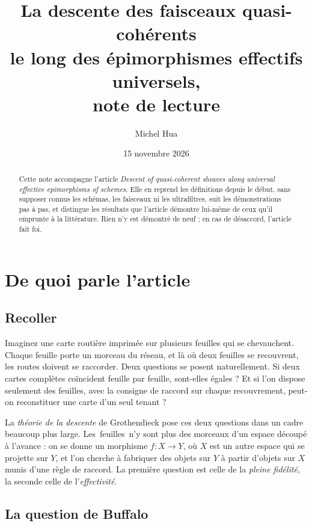 \documentclass[11pt,a4paper]{amsart}
\title[Note de lecture : descente le long des épimorphismes effectifs universels]{La descente des faisceaux quasi-cohérents\\ le long des épimorphismes effectifs universels,\\ note de lecture}
\author{Michel Hua}
\date{15 novembre 2026}
\theoremstyle{definition}
\theoremstyle{plain}
\theoremstyle{remark}
\begin{document}
\maketitle

\begin{abstract}
Cette note accompagne l'article \emph{Descent of quasi-coherent sheaves along universal effective epimorphisms of schemes}. Elle en reprend les définitions depuis le début, sans supposer connus les schémas, les faisceaux ni les ultrafiltres, suit les démonstrations pas à pas, et distingue les résultats que l'article démontre lui-même de ceux qu'il emprunte à la littérature. Rien n'y est démontré de neuf ; en cas de désaccord, l'article fait foi.
\end{abstract}

\section{De quoi parle l'article}

\subsection{Recoller}

Imaginez une carte routière imprimée sur plusieurs feuilles qui se chevauchent. Chaque feuille porte un morceau du réseau, et là où deux feuilles se recouvrent, les routes doivent se raccorder. Deux questions se posent naturellement. Si deux cartes complètes coïncident feuille par feuille, sont-elles égales ? Et si l'on dispose seulement des feuilles, avec la consigne de raccord sur chaque recouvrement, peut-on reconstituer une carte d'un seul tenant ?

La \emph{théorie de la descente} de Grothendieck pose ces deux questions dans un cadre beaucoup plus large. Les \guillemotleft\,feuilles\,\guillemotright{} n'y sont plus des morceaux d'un espace découpé à l'avance : on se donne un morphisme $f\colon X\to Y$, où $X$ est un autre espace qui se projette sur $Y$, et l'on cherche à fabriquer des objets sur $Y$ à partir d'objets sur $X$ munis d'une règle de raccord. La première question est celle de la \emph{pleine fidélité}, la seconde celle de l'\emph{effectivité}.

\subsection{La question de Buffalo}
\end{document}
